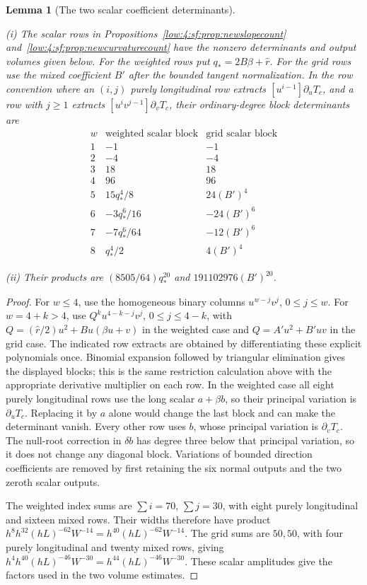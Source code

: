 \documentclass[11pt]{amsart}
\newtheorem{lemma}[theorem]{Lemma}
\theoremstyle{definition}
\theoremstyle{remark}
\numberwithin{equation}{section}
\begin{document}
\begin{lemma}[The two scalar coefficient determinants]\label{low:4:sf:scalar-determinants}

\noindent\textup{(i)} The scalar rows in Propositions~\ref{low:4:sf:prop:newslopecount} and~\ref{low:4:sf:prop:newcurvaturecount} have the nonzero determinants and output volumes given below. For the weighted rows put $q_*=2B\beta+\widehat r$. For the grid rows use the mixed coefficient $B'$ after the bounded tangent normalization. In the row convention where an $(i,j)$ purely longitudinal row extracts $[u^{i-1}]\partial_uT_c$, and a row with $j\ge1$ extracts $[u^iv^{j-1}]\partial_vT_c$, their ordinary-degree block determinants are
\[
\begin{array}{c|r|r}
w&\text{weighted scalar block}&\text{grid scalar block}\\ \hline
 1&-1&-1\\
 2&-4&-4\\
 3&18&18\\
 4&96&96\\
 5&15q_*^4/8&24(B')^4\\
 6&-3q_*^6/16&-24(B')^6\\
 7&-7q_*^6/64&-12(B')^6\\
 8&q_*^4/2&4(B')^4
\end{array}
\]

\noindent\textup{(ii)} Their products are $(8505/64)q_*^{20}$ and $191102976(B')^{20}$.
\end{lemma}
\begin{proof}
For $w\le4$, use the homogeneous binary columns $u^{w-j}v^j$, $0\le j\le w$. For $w=4+k>4$, use $Q^k u^{4-k-j}v^j$, $0\le j\le4-k$, with $Q=(\widehat r/2)u^2+Bu(\beta u+v)$ in the weighted case and $Q=A'u^2+B'uv$ in the grid case. The indicated row extracts are obtained by differentiating these explicit polynomials once. Binomial expansion followed by triangular elimination gives the displayed blocks; this is the same restriction calculation above with the appropriate derivative multiplier on each row. In the weighted case all eight purely longitudinal rows use the long scalar $a+\beta b$, so their principal variation is $\partial_uT_c$. Replacing it by $a$ alone would change the last block and can make the determinant vanish. Every other row uses $b$, whose principal variation is $\partial_vT_c$. The null-root correction in $\delta b$ has degree three below that principal variation, so it does not change any diagonal block. Variations of bounded direction coefficients are removed by first retaining the six normal outputs and the two zeroth scalar outputs.

The weighted index sums are $\sum i=70$, $\sum j=30$, with eight purely longitudinal and sixteen mixed rows. Their widths therefore have product $h^8h^{32}(hL)^{-62}W^{-14}=h^{40}(hL)^{-62}W^{-14}$. The grid sums are $50,50$, with four purely longitudinal and twenty mixed rows, giving $h^4h^{40}(hL)^{-46}W^{-30}=h^{44}(hL)^{-46}W^{-30}$. These scalar amplitudes give the factors used in the two volume estimates.
\end{proof}
\end{document}
